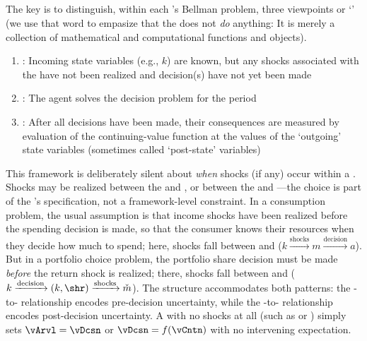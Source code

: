 \documentclass[titlepage, headings=optiontotocandhead]{econark}
\begin{document}
\hypertarget{prchs}{}
\subsection{\Prchs}\label{subsec:prchs}

The key is to distinguish, within each {\stg}'s Bellman problem, three viewpoints or `{\prchs}' (we use that word to empasize that the {\prch} does not \textit{do} anything: It is merely a collection of mathematical and computational functions and objects).
\begin{enumerate}
\item \textbf{\Arrival}: Incoming state variables (e.g., $k$) are known, but any shocks associated with the {\stg} have not been realized and decision(s) have not yet been made
\item \textbf{\Decision}: The agent solves the decision problem for the period
\item \textbf{\Continuation}: After all decisions have been made, their consequences are measured by evaluation of the continuing-value function at the values of the `outgoing' state variables (sometimes called `post-state' variables)
\end{enumerate}

This framework is deliberately silent about \textit{when} shocks (if any)
occur within a {\stg}. Shocks may be realized between the {\Arrival} and
{\Decision} {\prchs}, or between the {\Decision} and {\Continuation}
{\prchs}---the choice is part of the {\stg}'s specification, not a
framework-level constraint. In a consumption problem, the usual assumption
is that income shocks have been realized before the spending decision is
made, so that the consumer knows their resources when they decide how much
to spend; here, shocks fall between {\Arrival} and {\Decision}
($k \xrightarrow{\text{shocks}} m \xrightarrow{\text{decision}} a$).
But in a portfolio choice problem, the portfolio share decision must be made
\textit{before} the return shock is realized; there, shocks fall between
{\Decision} and {\Continuation}
($k \xrightarrow{\text{decision}} (k,\shr) \xrightarrow{\text{shocks}} \check{m}$).
The {\prch} structure accommodates both patterns: the {\Arrival}-to-{\Decision}
relationship encodes pre-decision uncertainty, while the
{\Decision}-to-{\Continuation} relationship encodes post-decision uncertainty.
A {\stg} with no shocks at all (such as  or
) simply sets $\vArvl = \vDcsn$ or $\vDcsn = f(\vCntn)$
with no intervening expectation.  
\end{document}
